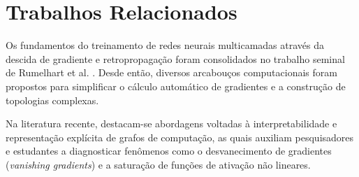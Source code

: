 ﻿\section{Trabalhos Relacionados}
\label{sec:trabalhos_relacionados}

Os fundamentos do treinamento de redes neurais multicamadas através da descida de gradiente e retropropagação foram consolidados no trabalho seminal de Rumelhart et al. \cite{rumelhart1986learning}. Desde então, diversos arcabouços computacionais foram propostos para simplificar o cálculo automático de gradientes e a construção de topologias complexas.

Na literatura recente, destacam-se abordagens voltadas à interpretabilidade e representação explícita de grafos de computação, as quais auxiliam pesquisadores e estudantes a diagnosticar fenômenos como o desvanecimento de gradientes (\textit{vanishing gradients}) e a saturação de funções de ativação não lineares.
